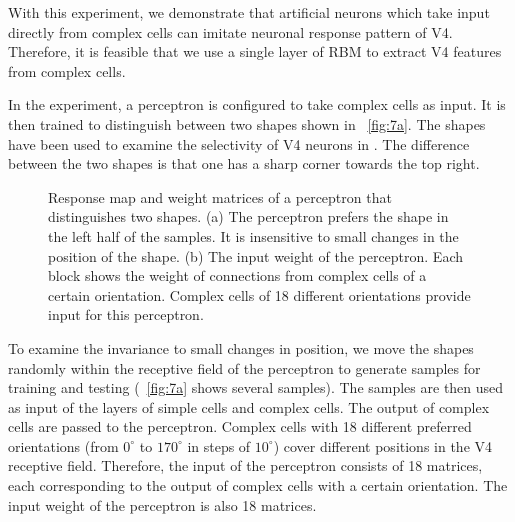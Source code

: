 \documentclass[twocolumn]{article}
\begin{document}
With this experiment, we demonstrate that artificial neurons which take input directly from complex cells can imitate neuronal response pattern of V4.
Therefore, it is feasible that we use a single layer of RBM to extract V4 features from complex cells.

In the experiment, a perceptron is configured to take complex cells as input.
It is then trained to distinguish between two shapes shown in \figurename~\ref{fig:7a}.
The shapes have been used to examine the selectivity of V4 neurons in \cite{pasupathy2001}.
The difference between the two shapes is that one has a sharp corner towards the top right.

\begin{figure}[!t]
\centering
{}\hfil
{}
\caption{Response map and weight matrices of a perceptron that distinguishes two shapes.
(a) The perceptron prefers the shape in the left half of the samples.
It is insensitive to small changes in the position of the shape.
(b) The input weight of the perceptron. 
Each block shows the weight of connections from complex cells of a certain orientation.
Complex cells of 18 different orientations provide input for this perceptron.}
\label{fig:7}
\end{figure}

To examine the invariance to small changes in position,
we move the shapes randomly within the receptive field of the perceptron 
to generate samples for training and testing (\figurename~\ref{fig:7a} shows several samples).
The samples are then used as input of the layers of simple cells and complex cells.
The output of complex cells are passed to the perceptron.
Complex cells with 18 different preferred orientations (from $0^\circ$ to $170^\circ$ in steps of $10^\circ$) 
cover different positions in the V4 receptive field.
Therefore, the input of the perceptron consists of 18 matrices, 
each corresponding to the output of complex cells with a certain orientation.
The input weight of the perceptron is also 18 matrices.
\end{document}
